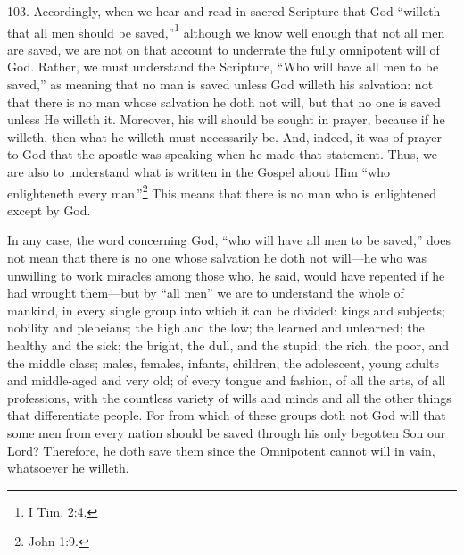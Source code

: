 
103. Accordingly, when we hear and read in sacred Scripture that God ``willeth that all men should be saved,''\footnote{I Tim. 2:4.} although we know well enough that not all men are saved, we are not on that account to underrate the fully omnipotent will of God. Rather, we must understand the Scripture, ``Who will have all men to be saved,'' as meaning that no man is saved unless God willeth his salvation: not that there is no man whose salvation he doth not will, but that no one is saved unless He willeth it. Moreover, his will should be sought in prayer, because if he willeth, then what he willeth must necessarily be. And, indeed, it was of prayer to God that the apostle was speaking when he made that statement. Thus, we are also to understand what is written in the Gospel about Him ``who enlighteneth every man.''\footnote{John 1:9.} This means that there is no man who is enlightened except by God.

In any case, the word concerning God, ``who will have all men to be saved,'' does not mean that there is no one whose salvation he doth not will—he who was unwilling to work miracles among those who, he said, would have repented if he had wrought them—but by ``all men'' we are to understand the whole of mankind, in every single group into which it can be divided: kings and subjects; nobility and plebeians; the high and the low; the learned and unlearned; the healthy and the sick; the bright, the dull, and the stupid; the rich, the poor, and the middle class; males, females, infants, children, the adolescent, young adults and middle-aged and very old; of every tongue and fashion, of all the arts, of all professions, with the countless variety of wills and minds and all the other things that differentiate people. For from which of these groups doth not God will that some men from every nation should be saved through his only begotten Son our Lord? Therefore, he doth save them since the Omnipotent cannot will in vain, whatsoever he willeth.

